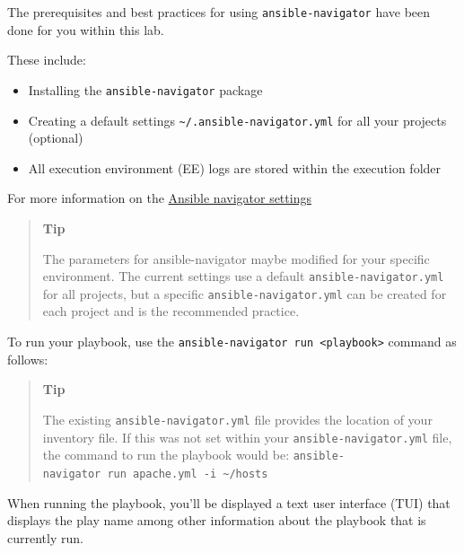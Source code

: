 The prerequisites and best practices for using
\texttt{ansible-navigator} have been done for you within this lab.

These include:
\begin{itemize}
\tightlist
\item Installing the \texttt{ansible-navigator} package
\item Creating a default settings \texttt{\textasciitilde{}/.ansible-navigator.yml} for all your projects (optional)
\item All execution environment (EE) logs are stored within the execution folder
\end{itemize}

For more information on the
\href{https://github.com/ansible/ansible-navigator/blob/main/docs/settings.rst}{Ansible
navigator settings}

\begin{quote}
\textbf{Tip}

The parameters for ansible-navigator maybe modified for your specific
environment. The current settings use a default
\texttt{ansible-navigator.yml} for all projects, but a specific
\texttt{ansible-navigator.yml} can be created for each project and is
the recommended practice.
\end{quote}

To run your playbook, use the
\texttt{ansible-navigator\ run\ \textless{}playbook\textgreater{}}
command as follows:

\begin{Shaded}
\begin{Highlighting}[]
\ExtensionTok{[student@controller}\NormalTok{ ansible{-}files]$ ansible{-}navigator run apache.yml}
\end{Highlighting}
\end{Shaded}

\begin{quote}
\textbf{Tip}

The existing \texttt{ansible-navigator.yml} file provides the location
of your inventory file. If this was not set within your
\texttt{ansible-navigator.yml} file, the command to run the playbook
would be:
\texttt{ansible-navigator\ run\ apache.yml\ -i\ \textasciitilde{}/hosts}
\end{quote}

When running the playbook, you'll be displayed a text user interface
(TUI) that displays the play name among other information about the
playbook that is currently run.

\begin{Shaded}
\begin{Highlighting}[]
\end{Highlighting}
\end{Shaded}

